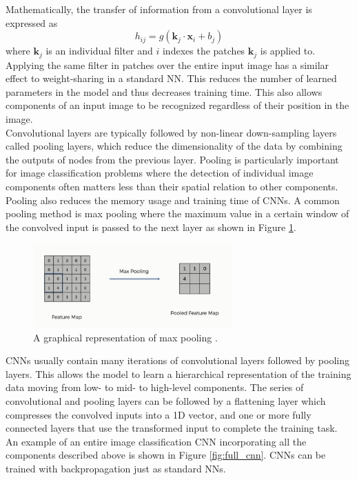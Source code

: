 Mathematically, the transfer of information from a convolutional layer is expressed as 
$$
h_{ij}=g(\mathbf{k}_j\cdot\mathbf{x}_i+b_j)
$$
\noindent where $\mathbf{k}_j$ is an individual filter and $i$ indexes the patches $\mathbf{k}_j$ is applied to. Applying the same filter in patches over the entire input image has a similar effect to weight-sharing in a standard NN. This reduces the number of learned parameters in the model and thus decreases training time. This also allows components of an input image to be recognized regardless of their position in the image.\\

Convolutional layers are typically followed by non-linear down-sampling layers called pooling layers, which reduce the dimensionality of the data by combining the outputs of nodes from the previous layer. Pooling is particularly important for image classification problems where the detection of individual image components often matters less than their spatial relation to other components. Pooling also reduces the memory usage and training time of CNNs. A common pooling method is max pooling where the maximum value in a certain window of the convolved input is passed to the next layer as shown in Figure \ref{fig:maxpool}.\\

\begin{figure}[htb!]
    \centering
    \includegraphics[width=3in]{figures/chapter4/maxpool.png}
    \caption{A graphical representation of max pooling \cite{cnn_blog}.}
    \label{fig:maxpool}
\end{figure}

CNNs usually contain many iterations of convolutional layers followed by pooling layers. This allows the model to learn a hierarchical representation of the training data moving from low- to mid- to high-level components. The series of convolutional and pooling layers can be followed by a flattening layer which compresses the convolved inputs into a 1D vector, and one or more fully connected layers that use the transformed input to complete the training task. An example of an entire image classification CNN incorporating all the components described above is shown in Figure \ref{fig:full_cnn}. CNNs can be trained with backpropagation just as standard NNs. 

